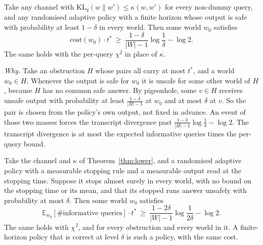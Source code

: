 
\begin{theorem}
\label{thm:lower}
Take any channel with $\mathrm{KL}_{q}(w\|w')\le\kappa(w,w')$ for every non-dummy query, and
any randomised adaptive policy with a finite horizon whose output is safe with probability at
least $1-\delta$ in every world. Then some world $w_{0}$ satisfies
\[
\mathrm{cost}(w_{0})\cdot t^{*}\ \ge\ \frac{1-\delta}{|W|-1}\log\frac1\delta-\log2 .
\]
The same holds with the per-query $\chi^{2}$ in place of $\kappa$.
\end{theorem}


\emph{Why.} Take an obstruction $H$ whose pairs all carry at most $t^{*}$, and a world
$w_{0}\in H$. Whenever the output is safe for $w_{0}$ it is unsafe for some other world of $H$,
because $H$ has no common safe answer. By pigeonhole, some $v\in H$ receives unsafe output with
probability at least $\frac{1-\delta}{|H|-1}$ at $w_{0}$ and at most $\delta$ at $v$. So the pair
is chosen from the policy's own output, not fixed in advance. An event of those two masses
forces the transcript divergence past $\frac{1-\delta}{|H|-1}\log\frac1\delta-\log2$. The
transcript divergence is at most the expected informative queries times the per-query bound.

\begin{theorem}
\label{thm:lowerstop}
Take the channel and $\kappa$ of Theorem~\ref{thm:lower}, and a randomised adaptive policy with
a measurable stopping rule and a measurable output read at the stopping time. Suppose it stops
almost surely in every world, with no bound on the stopping time or its mean, and that its
stopped runs answer unsafely with probability at most $\delta$. Then some world $w_{0}$ satisfies
\[
\mathbb{E}_{w_{0}}[\#\text{informative queries}]\cdot t^{*}\ \ge\
\frac{1-2\delta}{|W|-1}\log\frac1{2\delta}-\log2 .
\]
The same holds with $\chi^{2}$, and for every obstruction and every world in it. A finite-horizon
policy that is correct at level $\delta$ is such a policy, with the same cost.
\end{theorem}

